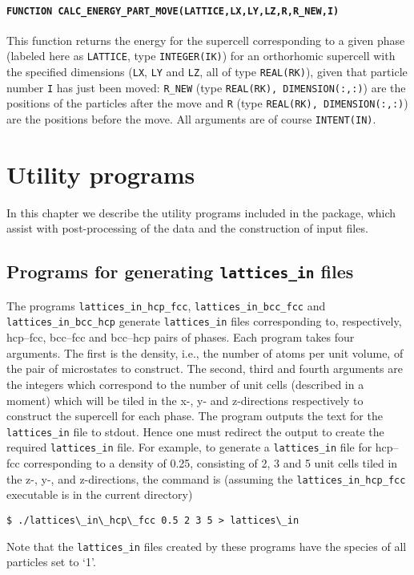 \documentclass{report}
\begin{document}
\subsubsection{\texttt{FUNCTION CALC\_ENERGY\_PART\_MOVE(LATTICE,LX,LY,LZ,R,R\_NEW,I)}}
This function returns the energy for the supercell corresponding to a given phase (labeled here as \verb|LATTICE|, type \verb|INTEGER(IK)|) for 
an orthorhomic supercell with the specified dimensions (\verb|LX|, \verb|LY| and \verb|LZ|, all of type \verb|REAL(RK)|), given that particle
number \verb|I| has just been moved: \verb|R_NEW| (type \verb|REAL(RK), DIMENSION(:,:)|) are the positions of the particles after the move
and \verb|R| (type \verb|REAL(RK), DIMENSION(:,:)|) are the positions before the move. All arguments are of course \verb|INTENT(IN)|. 




\chapter{Utility programs}\label{chapter:utility_programs}
In this chapter we describe the utility programs included in the package, which assist with post-processing of the data and the construction
of input files.

\section{Programs for generating \texttt{lattices\_in} files}
The programs \texttt{lattices\_in\_hcp\_fcc}, \texttt{lattices\_in\_bcc\_fcc} and \texttt{lattices\_in\_bcc\_hcp} generate \texttt{lattices\_in} 
files corresponding to, respectively, hcp--fcc, bcc--fcc and bcc--hcp pairs of phases.
Each program takes four arguments. The first is the density, i.e., the number of atoms per unit volume, of the pair of microstates to
construct. The second, third and fourth arguments are the integers which correspond
to the number of unit cells (described in a moment) which will be tiled in the x-, y- and z-directions respectively to construct the
supercell for each phase. The program outputs the text for the \texttt{lattices\_in} file to stdout. Hence one must redirect the output
to create the required \texttt{lattices\_in} file.
For example, to generate a \texttt{lattices\_in} file for hcp--fcc corresponding to a density of 0.25, consisting
of 2, 3 and 5 unit cells tiled in the z-, y-, and z-directions, the command is (assuming the \texttt{lattices\_in\_hcp\_fcc} executable
is in the current directory)
\begin{verbatim}
$ ./lattices\_in\_hcp\_fcc 0.5 2 3 5 > lattices\_in
\end{verbatim}
Note that the \texttt{lattices\_in} files created by these programs have the species of all particles set to `1'.
\end{document}
